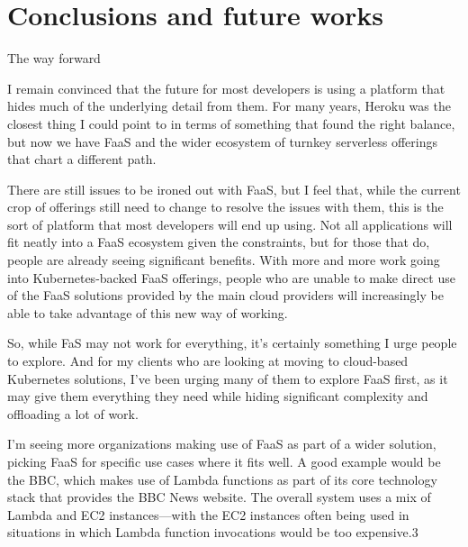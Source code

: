\chapter{Conclusions and future works}
The way forward

I remain convinced that the future for most developers is using a platform that hides much of the
underlying detail from them. For many years, Heroku was the closest thing I could point to in terms
of something that found the right balance, but now we have FaaS and the wider ecosystem of turnkey
serverless offerings that chart a different path.

There are still issues to be ironed out with FaaS, but I feel that, while the current crop of
offerings still need to change to resolve the issues with them, this is the sort of platform that
most developers will end up using. Not all applications will fit neatly into a FaaS ecosystem given
the constraints, but for those that do, people are already seeing significant benefits. With more
and more work going into Kubernetes-backed FaaS offerings, people who are unable to make direct use
of the FaaS solutions provided by the main cloud providers will increasingly be able to take
advantage of this new way of working.

So, while FaS may not work for everything, it’s certainly something I urge people to explore. And
for my clients who are looking at moving to cloud-based Kubernetes solutions, I’ve been urging many
of them to explore FaaS first, as it may give them everything they need while hiding significant
complexity and offloading a lot of work.

I’m seeing more organizations making use of FaaS as part of a wider solution, picking FaaS for
specific use cases where it fits well. A good example would be the BBC, which makes use of Lambda
functions as part of its core technology stack that provides the BBC News website. The overall
system uses a mix of Lambda and EC2 instances—with the EC2 instances often being used in situations
in which Lambda function invocations would be too expensive.3